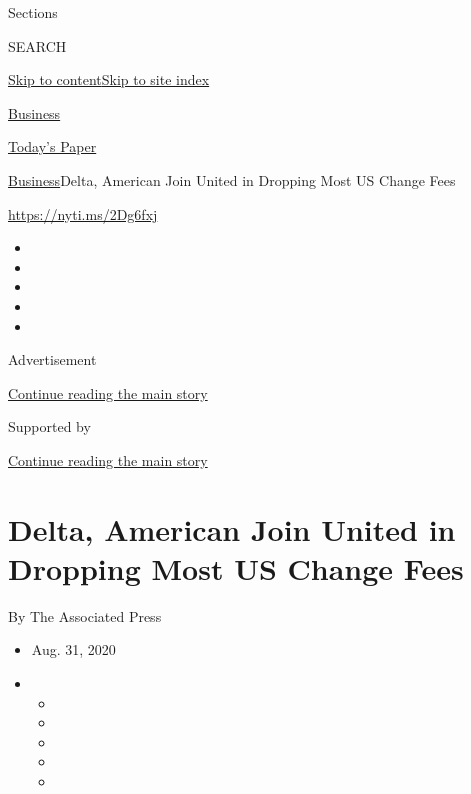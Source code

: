 Sections

SEARCH

\protect\hyperlink{site-content}{Skip to
content}\protect\hyperlink{site-index}{Skip to site index}

\href{https://www.nytimes3xbfgragh.onion/section/business}{Business}

\href{https://myaccount.nytimes3xbfgragh.onion/auth/login?response_type=cookie\&client_id=vi}{}

\href{https://www.nytimes3xbfgragh.onion/section/todayspaper}{Today's
Paper}

\href{/section/business}{Business}\textbar{}Delta, American Join United
in Dropping Most US Change Fees

\url{https://nyti.ms/2Dg6fxj}

\begin{itemize}
\item
\item
\item
\item
\item
\end{itemize}

Advertisement

\protect\hyperlink{after-top}{Continue reading the main story}

Supported by

\protect\hyperlink{after-sponsor}{Continue reading the main story}

\hypertarget{delta-american-join-united-in-dropping-most-us-change-fees}{%
\section{Delta, American Join United in Dropping Most US Change
Fees}\label{delta-american-join-united-in-dropping-most-us-change-fees}}

By The Associated Press

\begin{itemize}
\item
  Aug. 31, 2020
\item
  \begin{itemize}
  \item
  \item
  \item
  \item
  \item
  \end{itemize}
\end{itemize}

